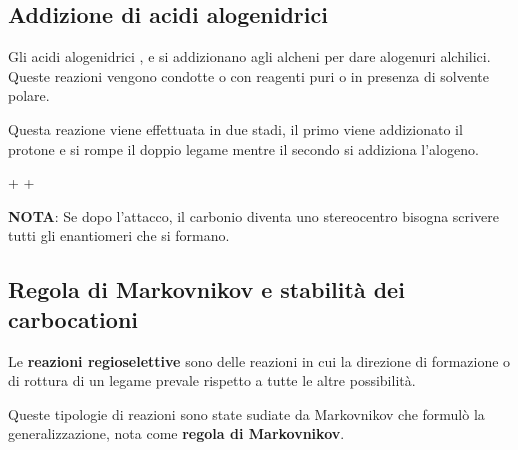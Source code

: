 
\subsection{Addizione di acidi alogenidrici}\label{ssec:idroalogenazione}
Gli acidi alogenidrici ,  e  si addizionano agli alcheni per dare alogenuri alchilici. Queste reazioni vengono condotte o con reagenti puri o in presenza di solvente polare.

Questa reazione viene effettuata in due stadi, il primo viene addizionato il protone e si rompe il doppio legame mentre il secondo si addiziona l'alogeno.

\begingroup
{}
\begin{reaction}
	 + 
	\arrow
	 + 
	\arrow
\end{reaction}
\endgroup

\begin{framed}
	\textbf{NOTA}: Se dopo l'attacco, il carbonio diventa uno stereocentro bisogna scrivere tutti gli enantiomeri che si formano.
\end{framed}


\subsection{Regola di Markovnikov e stabilità dei carbocationi}
Le \textbf{reazioni regioselettive} sono delle reazioni in cui la direzione di formazione o di rottura di un legame prevale rispetto a tutte le altre possibilità.

Queste tipologie di reazioni sono state sudiate da Markovnikov che formulò la generalizzazione, nota come \textbf{regola di Markovnikov}.

